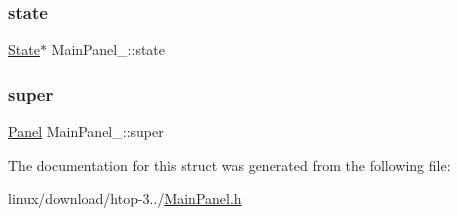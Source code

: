 \mbox{\label{structMainPanel___a82ba106ae3fa46509f65603b60325890}} 
\subsubsection{\texorpdfstring{state}{state}}
{\footnotesize\ttfamily \hyperlink{Action_8h_a1e6e0d01a9f6c24cd65838caadbf73b2}{State}$\ast$ Main\+Panel\+\_\+\+::state}

\mbox{\label{structMainPanel___a736bd6e3af407e7fb6297ca7fe915942}} 
\subsubsection{\texorpdfstring{super}{super}}
{\footnotesize\ttfamily \hyperlink{Panel_8h_a034d4c16521db412dc7a1e8536d16fae}{Panel} Main\+Panel\+\_\+\+::super}



The documentation for this struct was generated from the following file\+:\begin{DoxyCompactItemize}
\item 
linux/download/htop-\/3../\hyperlink{MainPanel_8h}{Main\+Panel.\+h}\end{DoxyCompactItemize}
